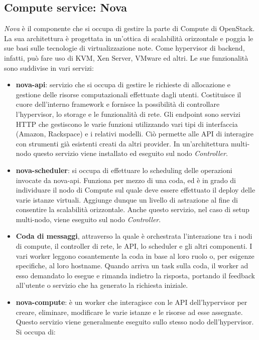 \subsection{Compute service: Nova}
\textit{Nova} è il componente che si occupa di gestire la parte di Compute di OpenStack. La sua architettura è progettata in un'ottica di scalabilità orizzontale e poggia le sue basi sulle tecnologie di virtualizzazione note. Come hypervisor di backend, infatti, può fare uso di KVM, Xen Server, VMware ed altri.
Le sue funzionalità sono suddivise in vari servizi:
\begin{itemize}
\item \textbf{nova-api}: servizio che si occupa di gestire le richieste di allocazione e gestione delle risorse computazionali effettuate dagli utenti.
Costituisce il cuore dell'interno framework e fornisce la possibilità di controllare l'hypervisor, lo storage e le funzionalità di rete.
Gli endpoint sono servizi HTTP che gestiscono le varie funzioni utilizzando vari tipi di interfaccia (Amazon, Rackspace) e i relativi modelli. Ciò permette alle API di interagire con strumenti già esistenti creati da altri provider.
In un'architettura multi-nodo questo servizio viene installato ed eseguito sul nodo \textit{Controller}.
\item \textbf{nova-scheduler}: si occupa di effettuare lo scheduling delle operazioni invocate da nova-api. Funziona per mezzo di una coda, ed è in grado di individuare il nodo di Compute sul quale deve essere effettuato il deploy delle varie istanze virtuali. Aggiunge dunque un livello di astrazione al fine di consentire la scalabilità orizzontale. Anche questo servizio, nel caso di setup multi-nodo, viene eseguito sul nodo \textit{Controller}.
\item \textbf{Coda di messaggi}, attraverso la quale è orchestrata l'interazione tra i nodi di compute, il controller di rete, le API, lo scheduler e gli altri componenti.
I vari worker leggono cosantemente la coda in base al loro ruolo o, per esigenze specifiche, al loro hostname.
Quando arriva un task sulla coda, il worker ad esso demandato lo esegue e rimanda indietro la risposta, portando il feedback all'utente o servizio che ha generato la richiesta iniziale.
\item \textbf{nova-compute}: è un worker che interagisce con le API dell'hypervisor per creare, eliminare, modificare le varie istanze e le risorse ad esse assegnate. Questo servizio viene generalmente eseguito sullo stesso nodo dell'hypervisor.
Si occupa di:
\begin{itemize}

\end{itemize}
\end{itemize}

